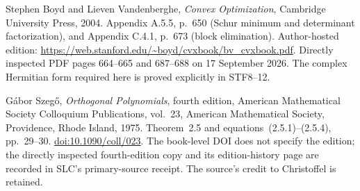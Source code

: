 Stephen Boyd and Lieven Vandenberghe,
\emph{Convex Optimization}, Cambridge University Press, 2004.
Appendix A.5.5, p.~650 (Schur minimum and determinant factorization),
and Appendix C.4.1, p.~673 (block elimination).
Author-hosted edition: \url{https://web.stanford.edu/~boyd/cvxbook/bv_cvxbook.pdf}.
Directly inspected PDF pages 664--665 and 687--688 on 17 September 2026.
The complex Hermitian form required here is proved explicitly in STF8--12.

G\'abor Szeg\H{o}, \emph{Orthogonal Polynomials},
fourth edition, American Mathematical Society Colloquium Publications,
vol.~23, American Mathematical Society, Providence, Rhode Island, 1975.
Theorem~2.5 and equations~(2.5.1)--(2.5.4), pp.~29--30.
\href{https://doi.org/10.1090/coll/023}{doi:10.1090/coll/023}.
The book-level DOI does not specify the edition; the directly inspected
fourth-edition copy and its edition-history page are recorded in SLC's
primary-source receipt. The source's credit to Christoffel is retained.

